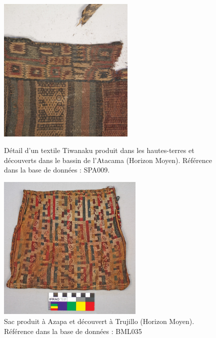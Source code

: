\begin{figure}[!h]
    \begin{minipage}[c]{.5\linewidth}
            \begin{center}
                \includegraphics[height=7cm]{../images/SPA009.jpg}
            \end{center}
            \caption{Détail d'un textile Tiwanaku produit dans les hautes-terres et découverts dans le bassin de l'Atacama (Horizon Moyen). Référence dans la base de données : SPA009.}
            \label{fig:SPA009}   
    \end{minipage}
\hspace{5pt}
        \begin{minipage}[c]{.5\linewidth}
        \begin{center}
        		\includegraphics[height=7cm]{../images/BML035.jpg}
	\end{center}
	\caption{Sac produit à Azapa et découvert à Trujillo (Horizon Moyen). \\ Référence dans la base de données : BML035}
	\label{fig:BML035}
    \end{minipage}
\end{figure}

